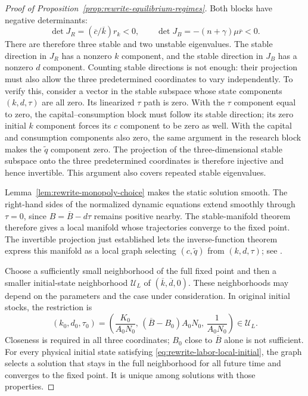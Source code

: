 \begin{proof}[Proof of Proposition~\ref{prop:rewrite-equilibrium-regimes}]
Both blocks have negative determinants:
\[
 \det J_R=(\overline c/\overline k)r_k<0,\qquad
 \det J_B=-(n+\gamma)\mu\overline r<0.
\]
There are therefore three stable and two unstable eigenvalues. The stable
direction in $J_R$ has a nonzero $k$ component, and the stable direction in
$J_B$ has a nonzero $d$ component. Counting stable directions is not enough:
their projection must also allow the three predetermined coordinates to
vary independently. To verify this, consider a vector in the stable subspace
whose
state components $(k,d,\tau)$ are all zero. Its linearized $\tau$ path is
zero. With the $\tau$ component equal to zero, the capital--consumption
block must follow its stable direction;
its zero initial $k$ component forces its $c$ component to be zero as well.
With the capital and consumption components also zero, the same argument
in the research block makes the $\widetilde q$ component zero.
The projection of the three-dimensional stable subspace
onto the three predetermined coordinates is therefore injective and hence
invertible. This argument also covers repeated stable eigenvalues.

Lemma~\ref{lem:rewrite-monopoly-choice} makes the static solution smooth.
The right-hand sides of the normalized dynamic equations extend smoothly
through $\tau=0$, since
$B=\overline B-d\tau$ remains positive nearby. The stable-manifold theorem
therefore gives a local manifold whose trajectories converge to the fixed
point. The invertible projection just established lets the inverse-function
theorem express this manifold as a local graph selecting $(c,\widetilde q)$
from $(k,d,\tau)$; see \citet{dyatlov2018}.

Choose a sufficiently small neighborhood of the full fixed point and then
a smaller initial-state neighborhood $\mathcal U_L$ of
$(\overline k,\overline d,0)$. These neighborhoods may depend on the
parameters and the case under consideration. In original initial stocks,
the restriction is
\begin{equation}
 (k_0,d_0,\tau_0)=
 \left(\frac{K_0}{A_0N_0},\,
       (\overline B-B_0)A_0N_0,\,
       \frac{1}{A_0N_0}\right)\in\mathcal U_L.
 \label{eq:rewrite-labor-local-initial}
\end{equation}
Closeness is required in all three coordinates; $B_0$ close to
$\overline B$ alone is not sufficient. For every physical initial state
satisfying \eqref{eq:rewrite-labor-local-initial}, the graph selects a
solution that stays in the full neighborhood for all future time and
converges to the fixed point. It is unique among solutions with those
properties.


\end{proof}
